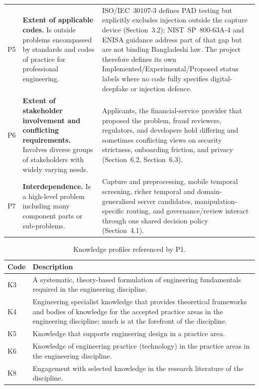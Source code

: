 \begin{table}[H]
\begin{tabularx}{\textwidth}{@{}p{9mm}p{30mm}Y@{}}
P5 & \textbf{Extent of applicable codes.} Is outside problems encompassed by
standards and codes of practice for professional engineering. & ISO/IEC~30107-3
defines PAD testing but explicitly excludes injection outside the capture device
(Section~3.2); NIST~SP~800-63A-4 and ENISA guidance address part of that gap but
are not binding Bangladeshi law. The project therefore defines its own
Implemented/Experimental/Proposed status labels where no code fully specifies
digital-deepfake or injection defence. \\
P6 & \textbf{Extent of stakeholder involvement and conflicting requirements.}
Involves diverse groups of stakeholders with widely varying needs. & Applicants,
the financial-service provider that proposed the problem, fraud reviewers,
regulators, and developers hold differing and sometimes conflicting views on
security strictness, onboarding friction, and privacy (Section~6.2,
Section~6.3). \\
P7 & \textbf{Interdependence.} Is a high-level problem including many component
parts or sub-problems. & Capture and preprocessing, mobile temporal screening,
richer temporal and domain-generalised server candidates, manipulation-specific
routing, and governance/review interact through one shared decision policy
(Section~4.1). \\
\bottomrule
\end{tabularx}
\end{table}

\begin{table}[H]
\centering
\caption{Knowledge profiles referenced by P1.}
\label{tab:knowledge-profiles}
\begin{tabularx}{\textwidth}{@{}p{9mm}Y@{}}
\toprule
Code & Description \\
\midrule
K3 & A systematic, theory-based formulation of engineering fundamentals required
in the engineering discipline. \\
K4 & Engineering specialist knowledge that provides theoretical frameworks and
bodies of knowledge for the accepted practice areas in the engineering
discipline; much is at the forefront of the discipline. \\
K5 & Knowledge that supports engineering design in a practice area. \\
K6 & Knowledge of engineering practice (technology) in the practice areas in the
engineering discipline. \\
K8 & Engagement with selected knowledge in the research literature of the
discipline. \\
\bottomrule
\end{tabularx}
\end{table}

